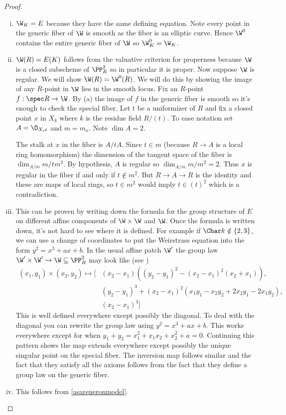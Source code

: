 \documentclass[11pt]{article}
\begin{document}
\begin{proof}
	\hfill
	\begin{enumerate}[(i)]
		\item $\W_K = E$ because they have the same defining equation. Note every point in the generic fiber of $\W$ is smooth as the fiber is an elliptic curve. Hence $\W^0$ contains the entire generic fiber of $\W$ so $\W^0_K = \W_K$.
		
		\item $\W(R) = E(K)$ follows from the valuative criterion for properness because $\W$ is a closed subscheme of $\PP^2_R$ so in particular it is proper. Now suppose $\W$ is regular. We will show $\W(R) = \W^0(R)$. We will do this by showing the image of any $R$-point in $\W$ lies in the smooth locus. Fix an $R$-point $f:\spec R \to \W$. By (a) the image of $f$ in the generic fiber is smooth so it's enough to check the special fiber. Let $t$ be a uniformizer of $R$ and fix a closed point $x$ in $X_k$ where $k$ is the residue field $R/(t)$. To ease notation set $A = \O_{X,x}$ and $m = m_x$. Note $\dim A = 2$.
		
		The stalk at $x$ in the fiber is $A/tA$. Since $t\in m$ (because $R \to A$ is a local ring homomorphism) the dimension of the tangent space of the fiber is $\dim_{A/m} m/tm^2$. By hypothesis, $A$ is regular so $\dim_{A/m} m/m^2 = 2$. Thus $x$ is regular in the fiber if and only if $t\notin m^2$. But $R \to A \to R$ is the identity and these are maps of local rings, so $t\in m^2$ would imply $t\in (t)^2$ which is a contradiction.
		
		\item This can be proven by writing down the formula for the group structure of $E$ on different affine components of $\W\times\W$ and $\W$. Once the formula is written down, it's not hard to see where it is defined. For example if $\Char k \notin\{2,3\}$, we can use a change of coordinates to put the Weirstrass equation into the form $y^2 = x^3 + ax + b$. In the usual affine patch $\W'$ the group law $\W'\times\W' \to \W\subseteq\PP^2_R$ may look like (see \cite[III.2.3]{silverman2009arithmetic})
		\begin{align*}
			(x_1,y_1)\times(x_2,y_2) \mapsto
			\bigg[
			&(x_2-x_1)\left((y_2-y_1)^2 - (x_2 - x_1)^2(x_2+x_1)\right),
			\\
			&(y_2-y_1)^3 + (x_2-x_1)^2(x_1y_1-x_2y_2+2x_2y_1-2x_1y_2),
			\\
			&(x_2-x_1)^3\bigg]
		\end{align*}
		This is well defined everywhere except possibly the diagonal. To deal with the diagonal you can rewrite the group law using $y^2 = x^3 + ax + b$. This works everywhere except for when $y_1+y_2=x_1^2+x_1x_2+x_2^2+a=0$. Continuing this pattern shows the map extends everywhere except possibly the unique singular point on the special fiber. The inversion map follows similar and the fact that they satisfy all the axioms follows from the fact that they define a group law on the generic fiber.
		
		\item This follows from \autoref{asareneronmodel}.
	\end{enumerate}
\end{proof}
\end{document}
